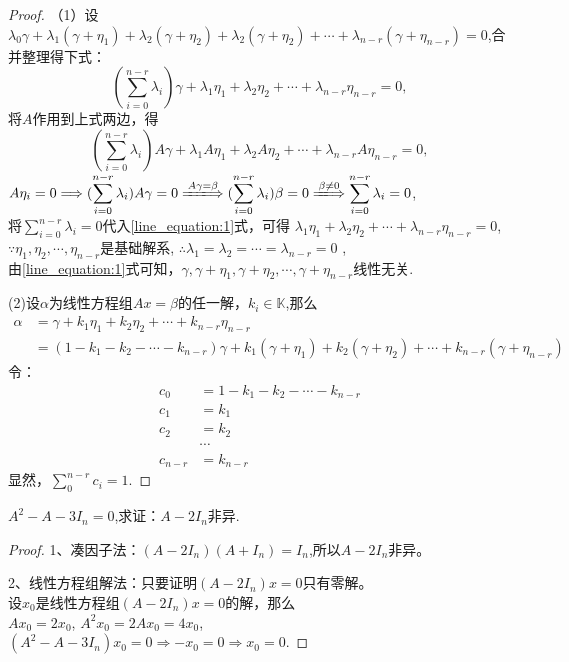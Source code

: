 \begin{proof}

  （1）设\(\lambda_0\gamma+\lambda_1(\gamma+\eta_1)+\lambda_2(\gamma+\eta_2)+
  \lambda_2(\gamma+\eta_2)+\cdots+\lambda_{n-r}(\gamma+\eta_{n-r})=0\),合并整理得下式：
  \begin{equation}\label{line_equation:1}
    (\sum_{i=0}^{n-r}\lambda_i)\gamma+\lambda_1\eta_1+
    \lambda_2\eta_2+\cdots+\lambda_{n-r}\eta_{n-r}=0,
  \end{equation}
  将\(A\)作用到上式两边，得
  \[
    (\sum_{i=0}^{n-r}\lambda_i)A\gamma+\lambda_1A\eta_1+\lambda_2A\eta_2+
    \cdots+\lambda_{n-r}A\eta_{n-r}=0,
  \]
  \(A\eta_i=0 \Longrightarrow (\displaystyle\sum_{i=0}^{n-r}\lambda_i)A\gamma=0
  \xLongrightarrow{A\gamma=\beta}(\displaystyle\sum_{i=0}^{n-r}\lambda_i)\beta=0
  \xLongrightarrow{\beta \neq 0}\displaystyle\sum_{i=0}^{n-r}\lambda_i=0\),\\
  将\(\displaystyle\sum_{i=0}^{n-r}\lambda_i=0\)代入\eqref{line_equation:1}式，可得
  \(\lambda_1\eta_1+\lambda_2\eta_2+\cdots+\lambda_{n-r}\eta_{n-r}=0\),\\
  \(\because \eta_1,\eta_2,\cdots,\eta_{n-r}\)是基础解系,
  \(\therefore \lambda_1=\lambda_2=\cdots=\lambda_{n-r}=0\) ,\\
  由\eqref{line_equation:1}式可知，\(\gamma,\gamma+\eta_1,\gamma+\eta_2,\cdots,
  \gamma+\eta_{n-r}\)线性无关.

  (2)设\(\alpha\)为线性方程组\(Ax=\beta\)的任一解，\(k_i \in \mathbb{K}\),那么
  \begin{align*}
    \alpha & = \gamma+k_1\eta_1+k_2\eta_2+\cdots+k_{n-r}\eta_{n-r}\\
           & = (1-k_1-k_2-\cdots-k_{n-r})\gamma+k_1(\gamma+\eta_1)+k_2(\gamma+\eta_2)+\cdots+k_{n-r}(\gamma+\eta_{n-r})
  \end{align*}
  令：
  \begin{align*}
    c_0 & = 1-k_1-k_2-\cdots-k_{n-r} \\
    c_1 & = k_1\\
    c_2 & = k_2\\
    & \cdots\\
    c_{n-r}& = k_{n-r}
  \end{align*}
  显然，\(\displaystyle\sum_0^{n-r}c_i=1\).
\end{proof}

\begin{example}
  \(A^2-A-3I_n=0\),求证：\(A-2I_n\)非异.
\end{example}

\begin{proof}

  1、凑因子法：\((A-2I_n)(A+I_n)=I_n\),所以\(A-2I_n\)非异。

  2、线性方程组解法：只要证明\((A-2I_n)x=0\)只有零解。\\
  设\(x_0\)是线性方程组\((A-2I_n)x=0\)的解，那么\\
  \(Ax_0=2x_0\), \(A^2x_0=2Ax_0=4x_0\),\\
  \((A^2-A-3I_n)x_0=0\Longrightarrow -x_0=0 \Longrightarrow x_0=0\).
\end{proof}

